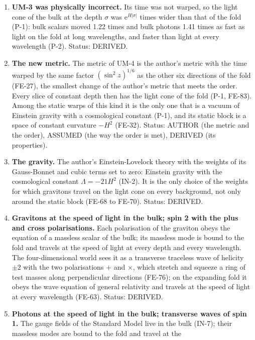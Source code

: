 \documentclass[
  10pt,
]{article}
\providecommand{\tightlist}{%
  \setlength{\itemsep}{0pt}\setlength{\parskip}{0pt}}
\begin{document}
\begin{enumerate}
\def\labelenumi{\arabic{enumi}.}
\tightlist
\item
  \textbf{UM-3 was physically incorrect.} Its time was not warped, so
  the light cone of the bulk at the depth \(\sigma\) was
  \(\mathrm{e}^{H\lvert\sigma\rvert}\) times wider than that of the fold
  (P-1): bulk scalars moved 1.22 times and bulk photons 1.41 times as
  fast as light on the fold at long wavelengths, and faster than light
  at every wavelength (P-2). Status: DERIVED.
\item
  \textbf{The new metric.} The metric of UM-4 is the author's metric
  with the time warped by the same factor \((\sin^2z)^{1/6}\) as the
  other six directions of the fold (FE-27), the smallest change of the
  author's metric that meets the order. Every slice of constant depth
  then has the light cone of the fold (P-1, FE-83). Among the static
  warps of this kind it is the only one that is a vacuum of Einstein
  gravity with a cosmological constant (P-1), and its static block is a
  space of constant curvature \(-H^2\) (FE-32). Status: AUTHOR (the
  metric and the order), ASSUMED (the way the order is met), DERIVED
  (its properties).
\item
  \textbf{The gravity.} The author's Einstein-Lovelock theory with the
  weights of its Gauss-Bonnet and cubic terms set to zero: Einstein
  gravity with the cosmological constant \(\Lambda = -21H^2\) (IN-2). It
  is the only choice of the weights for which gravitons travel on the
  light cone on every background, not only around the static block
  (FE-68 to FE-70). Status: DERIVED.
\item
  \textbf{Gravitons at the speed of light in the bulk; spin 2 with the
  plus and cross polarisations.} Each polarisation of the graviton obeys
  the equation of a massless scalar of the bulk; its massless mode is
  bound to the fold and travels at the speed of light at every depth and
  every wavelength. The four-dimensional world sees it as a transverse
  traceless wave of helicity \(\pm2\) with the two polarisations \(+\)
  and \(\times\), which stretch and squeeze a ring of test masses along
  perpendicular directions (FE-76); on the expanding fold it obeys the
  wave equation of general relativity and travels at the speed of light
  at every wavelength (FE-63). Status: DERIVED.
\item
  \textbf{Photons at the speed of light in the bulk; transverse waves of
  spin 1.} The gauge fields of the Standard Model live in the bulk
  (IN-7); their massless modes are bound to the fold and travel at the

\end{enumerate}
\end{document}

